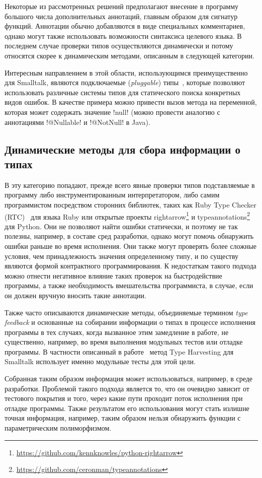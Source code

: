 Некоторые из рассмотренных решений предполагают внесение в программу большого
числа дополнительных аннотаций, главным образом для сигнатур функций. Аннотации
обычно добавляются в виде специальных комментариев, однако могут также
использовать возможности синтаксиса целевого языка. В последнем случае проверки
типов осуществляются динамически и потому относятся скорее к динамическим
методами, описанным в следующей категории.

Интересным направлением в этой области, использующимся преимущественно для
Smalltalk, являются подключаемые (\emph{pluggable}) типы~\cite{Haldiman2009},
которые позволяют использовать различные системы типов для статического поиска
конкретных видов ошибок. В качестве примера можно привести вызов метода на
переменной, которая может содержать значение !null! (можно провести аналогию с
аннотациями !@Nullable! и !@NotNull! в Java). 

\subsection{Динамические методы для сбора информации о типах}
\label{sec:dynamic-checks}

В эту категорию попадают, прежде всего явные проверки типов подставляемые в
программу либо инструментированным интерпретатором, либо самим программистом
посредством сторонних библиотек, таких как Ruby Type Checker (RTC)~\cite{Ren2013}
для языка Ruby или открытые проекты
rightarrow\footnote{\url{https://github.com/kennknowles/python-rightarrow}} и
typeannotations\footnote{\url{https://github.com/ceronman/typeannotations}} для
Python.  Они не позволяют найти ошибки статически, и поэтому не так полезны,
например, в составе
сред разработки, однако могут помочь обнаружить ошибки раньше во время
исполнения.  Они также могут проверять более сложные условия, чем принадлежность
значения определенному типу, и по существу являются формой контрактного
программирования.  К недостаткам такого подхода можно отнести негативное влияние
таких проверок на быстродействие программы, а также необходимость вмешательства
программиста, в случае, если он должен вручную вносить такие аннотации. 

Также часто описываются динамические методы, объединяемые термином \emph{type
  feedback} и основанные на собирании информации о типах в процессе исполнения
программы в тех случаях, когда вызванное этим замедление в работе, не
существенно, например, во время выполнения модульных тестов или отладке
программы. В частности описанный в работе~\cite{Haupt2011} метод Type Harvesting
для Smalltalk использует именно модульные тесты для этой цели.

Собранная таким образом информация может использоваться, например, в среде
разработки.  Проблемой такого подхода является то, что он очевидно зависит от
тестового покрытия и того, через какие пути проходит поток исполнения при
отладке программы. Также результатом его использования могут стать излишне
точная информация, например, таким образом нельзя обнаружить функции с
параметрическим полиморфизмом.
